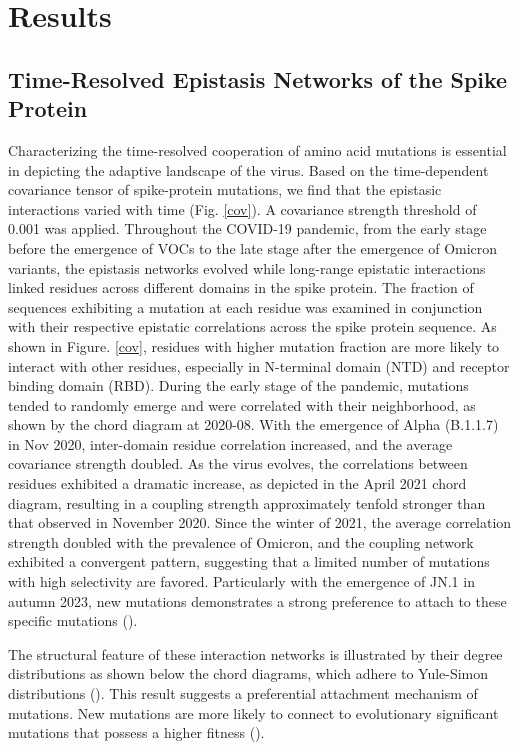 \documentclass{sysbio}%
\begin{document}
\section{Results}\label{result}

\subsection{Time-Resolved Epistasis Networks of the Spike Protein}  

Characterizing the time-resolved cooperation of amino acid mutations is essential in depicting the adaptive landscape of the virus. Based on the time-dependent covariance tensor of spike-protein mutations, we find that the epistasic interactions varied with time (Fig. \ref{cov}). A covariance strength threshold of 0.001 was applied. 
Throughout the COVID-19 pandemic, from the early stage before the emergence of VOCs to the late stage after the emergence of Omicron variants, the epistasis networks evolved while long-range epistatic interactions linked residues across different domains in the spike protein. The fraction of sequences exhibiting a mutation at each residue was examined in conjunction with their respective epistatic correlations across the spike protein sequence. As shown in Figure. \ref{cov}, residues with higher mutation fraction are more likely to interact with other residues, especially in N-terminal domain (NTD) and receptor binding domain (RBD). During the early stage of the pandemic, mutations tended to randomly emerge and were correlated with their neighborhood, as shown by the chord diagram at 2020-08. With the emergence of Alpha (B.1.1.7) in Nov 2020, inter-domain residue correlation increased, and the average covariance strength doubled. As the virus evolves, the correlations between residues exhibited a dramatic increase, as depicted in the April 2021 chord diagram, resulting in a coupling strength approximately tenfold stronger than that observed in November 2020. Since the winter of 2021, the average correlation strength doubled with the prevalence of Omicron, and the coupling network exhibited a convergent pattern, suggesting that a limited number of mutations with high selectivity are favored. Particularly with the emergence of JN.1 in autumn 2023, new mutations demonstrates a strong preference to attach to these specific mutations (\cite{compliciyt_rate,epistasis_g}).

The structural feature of these interaction networks is illustrated by their degree distributions as shown below the chord diagrams, which adhere to Yule-Simon distributions (\cite{yulesimon}). This result suggests a preferential attachment mechanism of mutations. New mutations are more likely to connect to evolutionary significant mutations that possess a higher fitness (\cite{yule,yulesimon}). 
\end{document}
